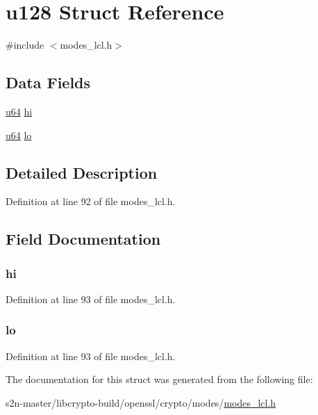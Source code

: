 \hypertarget{structu128}{}\section{u128 Struct Reference}
\label{structu128}


{\ttfamily \#include $<$modes\+\_\+lcl.\+h$>$}

\subsection*{Data Fields}
\begin{DoxyCompactItemize}
\item 
\hyperlink{modes__lcl_8h_ad758b7a5c3f18ed79d2fcd23d9f16357}{u64} \hyperlink{structu128_af6b74949f23cbd56d1549c4d481a8e11}{hi}
\item 
\hyperlink{modes__lcl_8h_ad758b7a5c3f18ed79d2fcd23d9f16357}{u64} \hyperlink{structu128_a175237671e89802eeedfcedf38a3e445}{lo}
\end{DoxyCompactItemize}


\subsection{Detailed Description}


Definition at line 92 of file modes\+\_\+lcl.\+h.



\subsection{Field Documentation}
\subsubsection[{\texorpdfstring{hi}{hi}}]{ hi}\hypertarget{structu128_af6b74949f23cbd56d1549c4d481a8e11}{}\label{structu128_af6b74949f23cbd56d1549c4d481a8e11}


Definition at line 93 of file modes\+\_\+lcl.\+h.

\subsubsection[{\texorpdfstring{lo}{lo}}]{ lo}\hypertarget{structu128_a175237671e89802eeedfcedf38a3e445}{}\label{structu128_a175237671e89802eeedfcedf38a3e445}


Definition at line 93 of file modes\+\_\+lcl.\+h.



The documentation for this struct was generated from the following file\+:\begin{DoxyCompactItemize}
\item 
s2n-\/master/libcrypto-\/build/openssl/crypto/modes/\hyperlink{modes__lcl_8h}{modes\+\_\+lcl.\+h}\end{DoxyCompactItemize}
